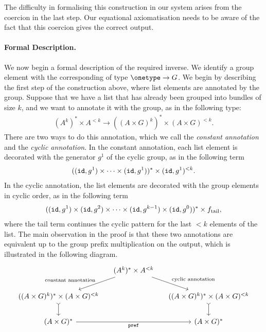 The difficulty in  formalising this  construction in our system arises from the  coercion in the last step. Our equational axiomatisation needs to be aware of the fact that this coercion gives the correct output.



\paragraph*{Formal Description.} \label{def:concmap-inverse} We now begin a formal description of the required inverse. We identify a group element  with the corresponding  of type $\onetype \to G$. We begin by describing the first step of the construction above, where list elements are annotated by the group. Suppose that we have a list that has already been grouped into bundles of size $k$, and we want to annotate it with the group, as in the following type:
\begin{align*}
    (A^k)^* \times A^{<k}  \to ((A \times G)^k)^* \times (A \times G)^{<k}.
\end{align*}
There are two ways to do this annotation, which we call the \emph{constant annotation} and the \emph{cyclic annotation}. In the constant annotation,  each list element is decorated with the generator $g^1$ of the cyclic group, as in the following term
\begin{align*}
    ((\mathtt{id}, g^1) \times \cdots \times  (\mathtt{id}, g^1))^* \times (\mathtt{id}, g^1)^{<k}.
\end{align*}
In the cyclic annotation, the list elements are decorated with the group elements in cyclic order, as in the following term
\begin{align*}
    ((\mathtt{id}, g^1) \times (\mathtt{id}, g^2) \times \cdots \times (\mathtt{id},  g^{k-1}) \times  (\mathtt{id}, g^0))^* \times f_\text{tail},
\end{align*}
where the tail term continues the cyclic pattern for the last $<k$ elements of the list. The main observation in the proof is that these two annotations are equivalent up to the group prefix multiplication on the output, which is illustrated in the following diagram.
\begin{equation}
    \label{eq:bundles-commutative-diagram}
    \begin{tikzcd}[column sep=small, ]
        & (A^k)^* \times A^{<k}
        \ar[dl,"\text{constant annotation}"']
        \ar[dr,"\text{cyclic annotation}"]
        \\
        ((A \times G)^k)^* \times (A \times G)^{<k}
        \ar[d,\concar]
        & &
        ((A \times G)^k)^* \times (A \times G)^{<k}
        \ar[d,\concar] \\
        (A \times G)^*
        \ar[rr,"\prefterm"']
        & &
        (A \times G)^*
    \end{tikzcd}
\end{equation}
